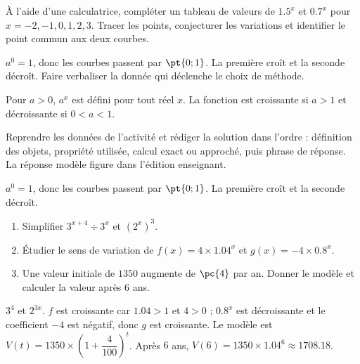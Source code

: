 \begin{activity}
À l'aide d'une calculatrice, compléter un tableau de valeurs de $\num{1,5}^x$ et $\num{0,7}^x$ pour $x=-2,-1,0,1,2,3$. Tracer les points, conjecturer les variations et identifier le point commun aux deux courbes.
\begin{center}\end{center}
\end{activity}
\begin{solution}$a^0=1$, donc les courbes passent par $\pt{0;1}$. La première croît et la seconde décroît. Faire verbaliser la donnée qui déclenche le choix de méthode.\end{solution}

\begin{summary}Pour $a>0$, $a^x$ est défini pour tout réel $x$. La fonction est croissante si $a>1$ et décroissante si $0<a<1$.\end{summary}

\begin{example}
Reprendre les données de l'activité et rédiger la solution dans l'ordre : définition des objets, propriété utilisée, calcul exact ou approché, puis phrase de réponse. La réponse modèle figure dans l'édition enseignant.
\end{example}
\begin{solution}$a^0=1$, donc les courbes passent par $\pt{0;1}$. La première croît et la seconde décroît.\end{solution}

\begin{exercise}[essentiel]
\begin{enumerate}\item Simplifier $3^{x+4}\div3^x$ et $(2^x)^3$.\item Étudier le sens de variation de $f(x)=4\times\num{1,04}^x$ et $g(x)=-4\times\num{0,8}^x$.\item Une valeur initiale de $1350$ augmente de $\pc{4}$ par an. Donner le modèle et calculer la valeur après $6$ ans.\end{enumerate}
\end{exercise}
\begin{solution}$3^4$ et $2^{3x}$. $f$ est croissante car $\num{1,04}>1$ et $4>0$ ; $\num{0,8}^x$ est décroissante et le coefficient $-4$ est négatif, donc $g$ est croissante. Le modèle est $V(t)=1350\times\left(1+\dfrac{4}{100}\right)^t$. Après $6$ ans, $V(6)=1350\times\num{1,04}^6\approx\num{1708,18}$.\end{solution}

